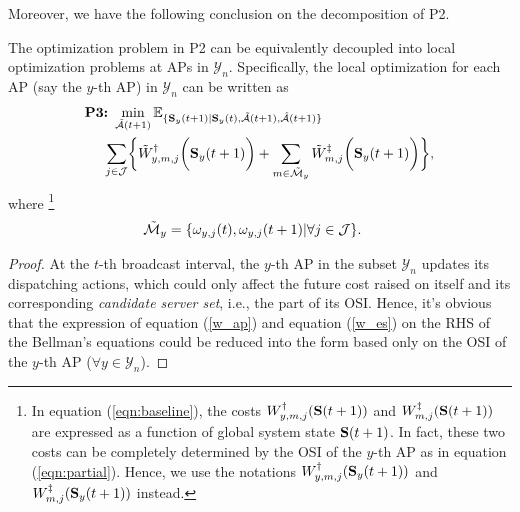 %
Moreover, we have the following conclusion on the decomposition of P2.
\begin{lemma}[]
    The optimization problem in P2 can be equivalently decoupled into local optimization problems at APs in $\mathcal{Y}_n$.%
    Specifically, {the local optimization for each AP (say the $y$-th AP) in $\mathcal{Y}_n$ can be written as}%
    \small{
    \begin{align}
        &\textbf{P3:}~
        \min_{ \tilde{\mathcal{A}}(t+1) } %
        \mathbb{E}_{\set{ \Stat_{y}(t+1)|\Stat_{y}(t), \tilde{\mathcal{A}}(t+1),\hat{\mathcal{A}}(t+1) }}
        \nonumber\\
        &~~~~\sum_{j\in\jSpace}
        \Brace{
            \tilde{W}^{\AP}_{y,m,j}\Paren{\Stat_{y}(t+1)}
            + \sum_{m\in\tilde{\esSet}_{y}} \tilde{W}^{\ES}_{m,j}\Paren{\Stat_{y}(t+1)}
        },
        \label{eqn:partial}
    \end{align}
    }%
    where \footnote{In equation (\ref{eqn:baseline}), the costs $W^{\dagger}_{y,m,j}(\mathbf{S}(t+1))$ and $W^{\ddagger}_{m,j}(\mathbf{S}(t+1))$ are expressed as a function of global system state $\mathbf{S}(t+1)$. In fact, these two costs can be completely determined by the OSI of the $y$-th AP as in equation (\ref{eqn:partial}). Hence, we use the notations $W^{\dagger}_{y,m,j}(\mathbf{S}_y(t+1))$ and $W^{\ddagger}_{m,j}(\mathbf{S}_y(t+1))$ instead.}
    {\small
    \begin{align*}
       \tilde{\mathcal{M}}_{y} &= \{\omega_{y,j}(t), \omega_{y,j}(t+1) | \forall j\in\mathcal{J}\}.
    \end{align*}
    }%
    \label{lemma:w_partial}
\end{lemma}
\begin{proof}
    At the $t$-th broadcast interval, the $y$-th AP in the subset $\mathcal{Y}_{n}$ updates its dispatching actions, which could only affect the future cost raised on itself and its corresponding \emph{candidate server set}, i.e., the part of its OSI.
    Hence, it's obvious that the expression of equation (\ref{w_ap}) and equation (\ref{w_es}) on the RHS of the Bellman's equations could be reduced into the form based only on the OSI of the $y$-th AP ($\forall y\in\mathcal{Y}_{n}$).
\end{proof}

